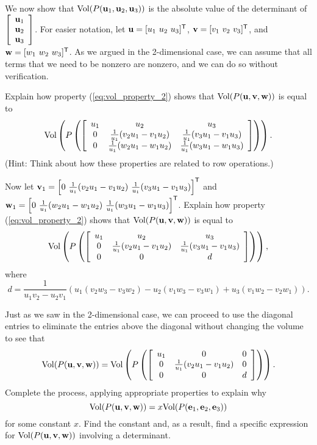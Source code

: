 \begin{pactivity} \label{act:det_vol} We now show that $\text{Vol}(P(\mathbf{u}_1, \mathbf{u}_2, \mathbf{u}_3))$ is the absolute value of the determinant of $\left[ \begin{array}{c} \mathbf{u}_1 \\ \mathbf{u}_2 \\ \mathbf{u}_3 \end{array} \right]$. For easier notation, let $\vu = [u_1 \ u_2 \ u_3]^{\tr}$, $\vv = [v_1 \ v_2 \ v_3]^{\tr}$, and $\vw = [w_1 \ w_2 \ w_3]^{\tr}$. As we argued in the 2-dimensional case, we can assume that all terms that we need to be nonzero are nonzero, and we can do so without verification. 
\ba
\item Explain how property (\ref{eq:vol_property_2}) shows that $\text{Vol}(P(\mathbf{u}, \mathbf{v}, \mathbf{w}))$ is equal to 
\[\text{Vol}\left(P\left( \left[ \begin{array}{ccc} u_{1}&u_{2}&u_{3}
\\ 0&\frac{1}{u_1}(v_{2}u_1-v_{1}u_{2})&\frac{1}{u_1}(v_{3}u_1-v_{1}u_{3})\\ 0&\frac{1}{u_1}(w_{2}u_1-w_{1}u_{2})&\frac{1}{u_1}(w_{3}u_1-w_{1}u_{3}) \end {array} \right] \right)\right).\]
(Hint: Think about how these properties are related to row operations.)

\item Now let $\vv_1 = \left[ 0 \ \frac{1}{u_1}(v_{2}u_1-v_{1}u_{2}) \ \frac{1}{u_1}(v_{3}u_1-v_{1}u_{3})\right]^{\tr}$ and \\
$\vw_1 = \left[ 0 \ \frac{1}{u_1}(w_{2}u_1-w_{1}u_{2}) \ \frac{1}{u_1}(w_{3}u_1-w_{1}u_{3})\right]^{\tr}$. Explain how property (\ref{eq:vol_property_2}) shows that $\text{Vol}(P(\mathbf{u}, \mathbf{v}, \mathbf{w}))$ is equal to
\[\text{Vol}\left(P\left( \left[ \begin{array}{ccc} u_{1}&u_{2}&u_{3}
\\ 0&\frac{1}{u_1}(v_{2}u_1-v_{1}u_{2})&\frac{1}{u_1}(v_{3}u_1-v_{1}u_{3})\\ 0&0&d \end {array} \right] \right)\right),\]
where 
\[d = \frac{1}{u_1v_2-u_2v_1}(u_1(v_2w_3-v_3w_2)-u_2(v_1w_3-v_{3}w_1)+u_3(v_1w_2-v_2w_1)).\]

\item Just as we saw in the 2-dimensional case, we can proceed to use the diagonal entries to eliminate the entries above the diagonal without changing the volume to see that 
\[\text{Vol}(P(\mathbf{u}, \mathbf{v}, \mathbf{w})) = \text{Vol}\left(P\left( \left[ \begin{array}{ccc} u_{1}&0&0
\\ 0&\frac{1}{u_1}(v_{2}u_1-v_{1}u_{2})&0\\ 0&0&d \end {array} \right] \right)\right).\]
Complete the process, applying appropriate properties to explain why 
\[\text{Vol}(P(\mathbf{u}, \mathbf{v}, \mathbf{w})) = x \text{Vol}(P(\mathbf{e}_1, \mathbf{e}_2, \mathbf{e}_3))\]
for some constant $x$. Find the constant and, as a result, find a specific expression for $\text{Vol}(P(\mathbf{u}, \mathbf{v}, \mathbf{w}))$ involving a determinant. 


\ea

\end{pactivity}


